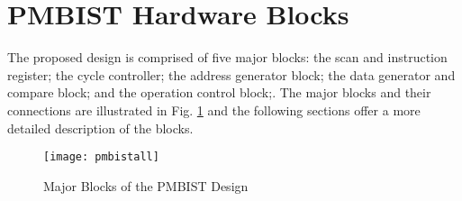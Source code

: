 \section{PMBIST Hardware Blocks}
\label{sect:bg-blocks}
The proposed design is comprised of five major blocks: the scan and instruction register; the cycle controller; the address generator block; the data generator and compare block; and the operation control block;.  The major blocks and their connections are illustrated in Fig. \ref{fig:pmbistall} and the following sections offer a more detailed description of the blocks.

\begin{figure}[H]
  \centering
  \texttt{[image: pmbistall]}
  \caption{Major Blocks of the PMBIST Design}
  \label{fig:pmbistall}
\end{figure}








